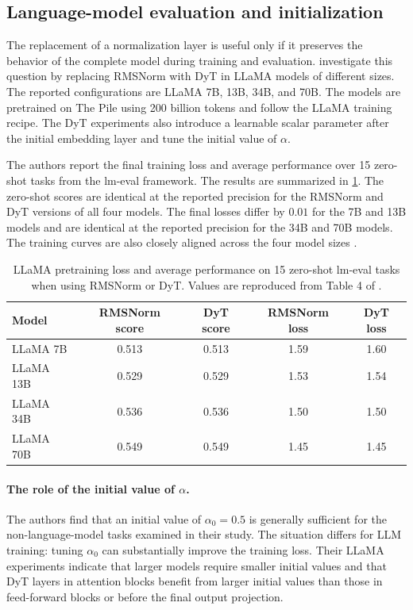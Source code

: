 \subsection{Language-model evaluation and initialization}
\label{subsec:norm-language-model-evaluation}

The replacement of a normalization layer is useful only if it preserves
the behavior of the complete model during training and evaluation.
\textcite{zhu2025dyt} investigate this question by replacing RMSNorm with
DyT in LLaMA models of different sizes. The reported configurations are
LLaMA 7B, 13B, 34B, and 70B. The models are pretrained on The Pile using
200 billion tokens and follow the LLaMA training recipe. The DyT
experiments also introduce a learnable scalar parameter after the initial
embedding layer and tune the initial value of \(\alpha\).

The authors report the final training loss and average performance over
15 zero-shot tasks from the lm-eval framework. The results are summarized
in \cref{tab:norm-llama-results}. The zero-shot scores are identical at
the reported precision for the RMSNorm and DyT versions of all four
models. The final losses differ by \(0.01\) for the 7B and 13B models and
are identical at the reported precision for the 34B and 70B models.
The training curves are also closely aligned across the four model sizes
\parencite{zhu2025dyt}.

\begin{table}[htbp]
    \centering
    \caption{LLaMA pretraining loss and average performance on 15 zero-shot
    lm-eval tasks when using RMSNorm or DyT. Values are reproduced from
    Table 4 of \textcite{zhu2025dyt}.}
    \label{tab:norm-llama-results}
    \begin{tabular}{lcccc}
        \toprule
        Model
        & RMSNorm score
        & DyT score
        & RMSNorm loss
        & DyT loss \\
        \midrule
        LLaMA 7B  & 0.513 & 0.513 & 1.59 & 1.60 \\
        LLaMA 13B & 0.529 & 0.529 & 1.53 & 1.54 \\
        LLaMA 34B & 0.536 & 0.536 & 1.50 & 1.50 \\
        LLaMA 70B & 0.549 & 0.549 & 1.45 & 1.45 \\
        \bottomrule
    \end{tabular}
\end{table}

\paragraph{The role of the initial value of \(\alpha\).}
The authors find that an initial value of \(\alpha_0=0.5\) is generally
sufficient for the non-language-model tasks examined in their study.
The situation differs for LLM training: tuning \(\alpha_0\) can
substantially improve the training loss. Their LLaMA experiments indicate
that larger models require smaller initial values and that DyT layers in
attention blocks benefit from larger initial values than those in
feed-forward blocks or before the final output projection.

